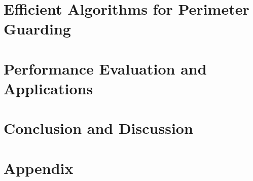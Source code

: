 \section{Efficient Algorithms for Perimeter Guarding}\label{section:algorithm}


\section{Performance Evaluation and Applications}\label{section:evaluation}


\section{Conclusion and Discussion}\label{section:conclusion}





\newpage
\section*{Appendix}\label{section:appendix}





